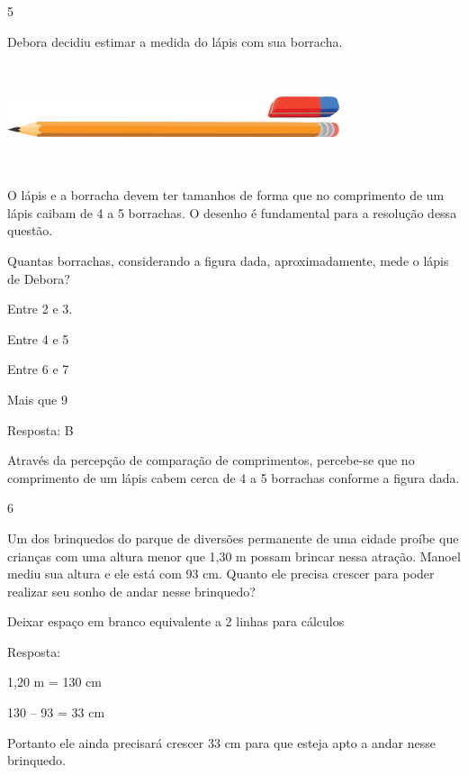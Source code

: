 
\num{5}

Debora decidiu estimar a medida do lápis com sua borracha.

\includegraphics[width=3.84200in,height=1.23344in]{media/image46.png}

O lápis e a borracha devem ter tamanhos de forma que no comprimento de
um lápis caibam de 4 a 5 borrachas. O desenho é fundamental para a
resolução dessa questão.

Quantas borrachas, considerando a figura dada, aproximadamente, mede o
lápis de Debora?

\begin{escolha}
\item
  Entre 2 e 3.
\item
  Entre 4 e 5
\item
  Entre 6 e 7
\item
  Mais que 9
\end{escolha}

Resposta: B

Através da percepção de comparação de comprimentos, percebe-se que no
comprimento de um lápis cabem cerca de 4 a 5 borrachas conforme a figura
dada.

\num{6}

Um dos brinquedos do parque de diversões permanente de uma cidade proíbe
que crianças com uma altura menor que 1,30 m possam brincar nessa
atração. Manoel mediu sua altura e ele está com 93 cm. Quanto ele
precisa crescer para poder realizar seu sonho de andar nesse brinquedo?

Deixar espaço em branco equivalente a 2 linhas para cálculos

Resposta:

1,20 m = 130 cm

130 -- 93 = 33 cm

Portanto ele ainda precisará crescer 33 cm para que esteja apto a andar
nesse brinquedo.

